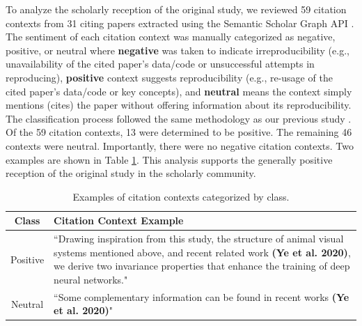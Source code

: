 To analyze the scholarly reception of the original study, we reviewed 59 citation contexts from 31 citing papers extracted using the Semantic Scholar Graph API \cite{s2GA-Kinney2023TheSS}. The sentiment of each citation context was manually categorized as negative, positive, or neutral %
where \textbf{negative} was taken to indicate irreproducibility (e.g., unavailability of the cited paper’s data/code or unsuccessful attempts in reproducing), \textbf{positive} context suggests reproducibility (e.g., re-usage of the cited paper’s data/code or key concepts), and \textbf{neutral} means the context simply mentions (cites) the paper without offering information about its reproducibility. The classification process followed the same methodology as our previous study \cite{obadage2024-10.1145/3641525.3663628}. Of the 59 citation contexts, 13 were determined to be positive. The remaining 46 contexts were neutral. Importantly, there were no negative citation contexts. Two examples are shown in Table \ref{tab:citation_contexts_exapmles}. This analysis supports the generally positive reception of the original study in the scholarly community.\\

\begin{table}[h!]
\caption{Examples of citation contexts categorized by class.}
\centering
\begin{tabular}{|c|p{10cm}|}
\hline
\textbf{Class} & \textbf{Citation Context Example} \\
\hline
Positive & ``Drawing inspiration from this study, the structure of animal visual systems mentioned above, and recent related work \textbf{(Ye et al. 2020)}, we derive two invariance properties that enhance the training of deep neural networks." \\
\hline
Neutral & ``Some complementary information can be found in recent works \textbf{(Ye et al. 2020)}" \\
\hline
\end{tabular}
\label{tab:citation_contexts_exapmles}
\end{table}



